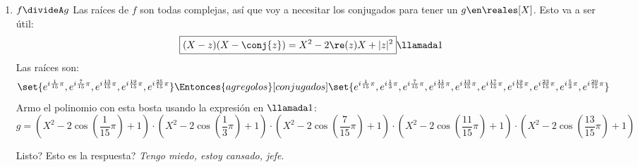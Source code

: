 \begin{enumerate}[label=\alph*)]
  \item $f \divideA g$
        Las raíces de $f$ son todas complejas, así que voy a necesitar los conjugados para tener un $g \en \reales[X]$.
        Esto va a ser útil:
        $$
          \boxed{
            (X - z)(X- \conj{z})
            =
            X^2 - 2\re(z)X + |z|^2
          }\llamada1
        $$
        Las raíces son:
        $$
          \set{
            e^{i \frac{1}{15} \pi},
            e^{i \frac{7}{15} \pi},
            e^{i \frac{13}{15} \pi},
            e^{i \frac{19}{15} \pi},
            e^{i \frac{25}{15} \pi}
          }
          \Entonces{agrego los}[conjugados]
          \set{
            e^{i \frac{1}{15} \pi},
            e^{i \frac{1}{3} \pi},
            e^{i \frac{7}{15} \pi},
            e^{i \frac{11}{15} \pi},
            e^{i \frac{13}{15} \pi},
            e^{i \frac{17}{15} \pi},
            e^{i \frac{19}{15} \pi},
            e^{i \frac{23}{15} \pi},
            e^{i \frac{5}{3} \pi},
            e^{i \frac{29}{15} \pi}
          }
        $$
        Armo el polinomio con esta bosta usando la expresión en $\llamada1$:
        $$
          \scriptstyle
          g =
          (X^2 -2\cos(\frac{1}{15}\pi) + 1) \cdot
          (X^2 -2\cos(\frac{1}{3}\pi) + 1) \cdot
          (X^2 -2\cos(\frac{7}{15}\pi) + 1) \cdot
          (X^2 -2\cos(\frac{11}{15}\pi) + 1) \cdot
          (X^2 -2\cos(\frac{13}{15}\pi) + 1)
        $$

        Listo? Esto es la respuesta? \textit{Tengo miedo, estoy cansado, jefe}.

\end{enumerate}

\begin{aportes}
  \item {}
\end{aportes}
